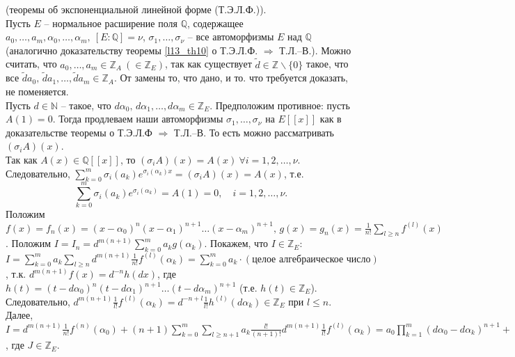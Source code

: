 \begin{pf} (теоремы об экспоненциальной линейной форме (Т.Э.Л.Ф.)).\\
	Пусть $E$ -- нормальное расширение поля $\mathbb{Q}$, содержащее $a_0,\dots,a_m,\alpha_0,\dots,\alpha_m, \ [E \colon \mathbb{Q}] = \nu$, $\sigma_1,\dots,\sigma_\nu$ -- все автоморфизмы $E$ над $\mathbb{Q}$ (аналогично доказательству теоремы \ref{l13_th10} о Т.Э.Л.Ф. $\Rightarrow$ Т.Л.--В.).
	Можно считать, что $a_0, \dots, a_m \in \mathbb{Z}_A \ (\in \mathbb{Z}_E)$, так как существует $\tilde{d} \in \mathbb{Z} \backslash \{ 0 \}$ такое, что все $\tilde{d}a_0, \, \tilde{d}a_1, \dots, \tilde{d}a_m \in \mathbb{Z}_A$. От замены то, что дано, и то. что требуется доказать, не поменяется.\\
	Пусть $d \in \mathbb{N}$ -- такое, что $d\alpha_0, \, d\alpha_1, \dots, d\alpha_m \in \mathbb{Z}_E$. Предположим противное: пусть $A(1)=0$. Тогда продлеваем наши автоморфизмы $\sigma_1, \dots, \sigma_\nu$ на $E[[x]]$ как в доказательстве теоремы о Т.Э.Л.Ф $\Rightarrow$ Т.Л.--В. То есть можно рассматривать $(\sigma_iA)(x)$.\\
	Так как $A(x) \in \mathbb{Q}[[x]]$, то $(\sigma_iA)(x) = A(x) \ \forall i = 1,2,\dots,\nu$. Следовательно, $\displaystyle \sum\limits_{k=0}^m \sigma_i (a_k) e^{\sigma_i(\alpha_k)x} = (\sigma_iA)(x) = A(x)$, т.е.
	$$\sum\limits_{k=0}^m \sigma_i(a_k)e^{\sigma_i(\alpha_k)} = A(1) = 0, \quad i = 1,2,\dots,\nu.$$
	Положим $\displaystyle f(x) = f_n(x) = (x-\alpha_0)^n(x-\alpha_1)^{n+1}\dots(x-\alpha_m)^{n+1}, \, g(x) = g_n(x) = \frac{1}{n!} \sum\limits_{l \geq n} f^{(l)}(x)$.
	Положим $\displaystyle I=I_n = d^{m(n+1)} \sum\limits_{k=0}^m a_kg(\alpha_k)$. Покажем, что $I \in \mathbb{Z}_E$:\\
	$\displaystyle I = \sum\limits_{k=0}^m a_k \sum\limits_{l \geq n} d^{m(n+1)}\frac{1}{n!}f^{(l)}(\alpha_k) = \sum\limits_{k=0}^m a_k \cdot (\text{целое алгебраическое число})$, т.к. $d^{m(n+1)}f(x) = d^{-n}h(dx)$, где $h(t) = (t-d\alpha_0)^n(t-d\alpha_1)^{n+1}\dots(t-d\alpha_m)^{n+1}$ (т.е. $h(t) \in \mathbb{Z}_E$).
	Следовательно, $\displaystyle d^{m(n+1)}\frac{1}{l!}f^{(l)}(\alpha_k) = d^{-n+l}\frac{1}{l!}h^{(l)}(d\alpha_k) \in \mathbb{Z}_E$ при $l \leq n$. Далее,\\
	$\displaystyle I = d^{m(n+1)}\frac{1}{n!}f^{(n)}(\alpha_0) + (n+1)\sum\limits_{k=0}^m\sum\limits_{l \geq n+1} a_k\frac{l!}{(n+1)!}d^{m(n+1)}\frac{1}{l!}f^{(l)}(\alpha_k) = a_0\prod\limits_{k=1}^m (d\alpha_0-d\alpha_k)^{n+1} + (n+1)J$, где $J \in \mathbb{Z}_E$.\\

\end{pf}
